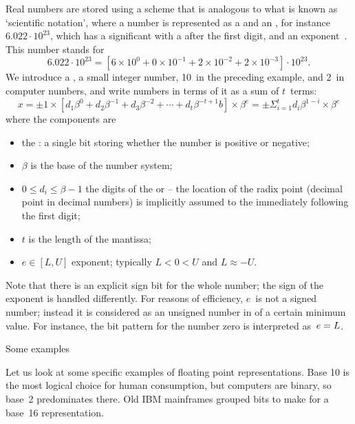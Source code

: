 Real numbers are stored using a scheme that is analogous to what is
known as `scientific notation', where a number is represented as a
 and an , for
instance~$6.022\cdot 10^{23}$, which has a significant  with a
 after the first digit, and an exponent~.
This number stands for
\[ 6.022\cdot 10^{23}= \left[
    6\times 10^0+0\times 10^{-1}+2\times10^{-2}+2\times10^{-3}
    \right] \cdot 10^{23}. 
\]
We introduce a , 
a small integer number, 10~in the preceding example, and 2~in computer
numbers, and write numbers in terms of it as a sum of $t$~terms:
\begin{equation}
    x = \pm 1 \times \left[
       d_1\beta^0+d_2\beta^{-1}+d_3\beta^{-2}+\cdots+d_t\beta^{-t+1}b\right] \times \beta^e =
       \pm \Sigma_{i=1}^t d_i\beta^{1-i}  \times\beta^e
       \label{eq:floatingpoint-def}
\end{equation}
where the components are
\begin{itemize}
\item the : a single bit storing whether the
  number is positive or negative;
\item $\beta$ is the base of the number system;
\item $0\leq d_i\leq \beta-1$ the digits of the 
  or  -- the location of the radix point
  (decimal point in decimal numbers) is implicitly assumed to the
  immediately following the first digit;
\item $t$ is the length of the mantissa;
\item $e\in [L,U]$ exponent; typically $L<{0}<{U} $ and $L\approx-U$.
\end{itemize}

Note that there is an explicit sign bit for the whole number; the sign
of the exponent is handled differently. 
For reasons of efficiency, $e$~is not a signed number; instead it is
considered as an unsigned number in  of a certain minimum
value. For instance, the bit pattern for the number zero is
interpreted as~$e=\nobreak L$.

 {Some examples}

Let us look at some specific examples of floating point
representations. Base 10 is the most logical choice for human
consumption, but computers are binary, so base~2 predominates
there. Old IBM mainframes grouped bits to make for a base~16
representation.

